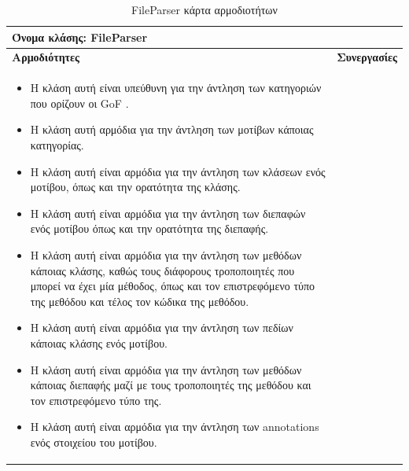 \begin{table}[H]
    \centering
    \begin{tabular}{|p{10cm}|p{5cm}|}
        \hline
        \multicolumn{2}{|l|}{Όνομα κλάσης: FileParser} \\
        \hline
        \textbf{Αρμοδιότητες} & \textbf{Συνεργασίες} \\
        \hline
        \begin{itemize}
            \item Η κλάση αυτή είναι υπεύθυνη για την άντληση των κατηγοριών που ορίζουν οι GoF \cite{GoF}.
            \item Η κλάση αυτή αρμόδια για την άντληση των μοτίβων κάποιας κατηγορίας.
            \item Η κλάση αυτή είναι αρμόδια για την άντληση των κλάσεων ενός μοτίβου, όπως και την ορατότητα της κλάσης.
            \item Η κλάση αυτή είναι αρμόδια για την άντληση των διεπαφών ενός μοτίβου όπως και την ορατότητα της διεπαφής.
            \item Η κλάση αυτή είναι αρμόδια για την άντληση των μεθόδων κάποιας κλάσης, καθώς τους διάφορους τροποποιητές που μπορεί 
            να έχει μία μέθοδος, όπως και τον επιστρεφόμενο τύπο της μεθόδου και τέλος τον κώδικα της μεθόδου.
            \item Η κλάση αυτή είναι αρμόδια για την άντληση των πεδίων κάποιας κλάσης ενός μοτίβου.
            \item Η κλάση αυτή είναι αρμόδια για την άντληση των μεθόδων κάποιας διεπαφής μαζί με τους 
            τροποποιητές της μεθόδου και τον επιστρεφόμενο τύπο της.
            \item Η κλάση αυτή είναι αρμόδια για την άντληση των annotations ενός στοιχείου του μοτίβου.
        \end{itemize} &   
         \\
        \hline
    \end{tabular}
    \label{tab:fileParserCRC}
    \caption{FileParser κάρτα αρμοδιοτήτων}
\end{table}
